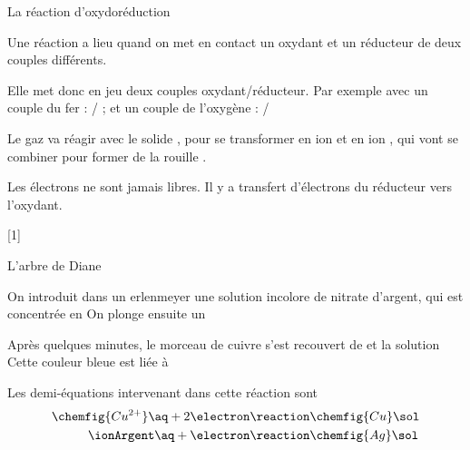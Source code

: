 \begin{doc}{La réaction d'oxydoréduction}
  \begin{importants}
    Une réaction  a lieu quand on met en contact un oxydant et un réducteur de deux couples différents.
  \end{importants}
  
  Elle met donc en jeu deux couples oxydant/réducteur.
  Par exemple avec un couple du fer : \ionFerIII/ ; et un couple de l'oxygène : \dioxygene/\ionOxygene

  Le gaz \dioxygene va réagir avec le solide , pour se transformer en ion \ionFerIII et en ion \ionOxygene, qui vont se combiner pour former de la rouille .

  \begin{importants}
    Les électrons ne sont jamais libres.
    Il y a transfert d'électrons du réducteur vers l'oxydant.
  \end{importants}
\end{doc}

[1]

\begin{doc}{L'arbre de Diane}
  \begin{wrapfigure}[4]{r}{0.1\linewidth}
    \vspace*{-24pt}
  \end{wrapfigure}

  \moleculesGras
  On introduit dans un erlenmeyer une solution incolore de nitrate d'argent, qui est concentrée en 
  On plonge ensuite un 

  Après quelques minutes, le morceau de cuivre s'est recouvert de  et la solution 
  Cette couleur bleue est liée à 
  \moleculesNormale

  Les demi-équations intervenant dans  cette réaction sont
  \begin{align*}
    \chemfig{Cu^{2+}}\aq + 2\electron &\reaction \chemfig{Cu}\sol \\
    \ionArgent\aq + \electron &\reaction \chemfig{Ag}\sol
  \end{align*}
\end{doc}

